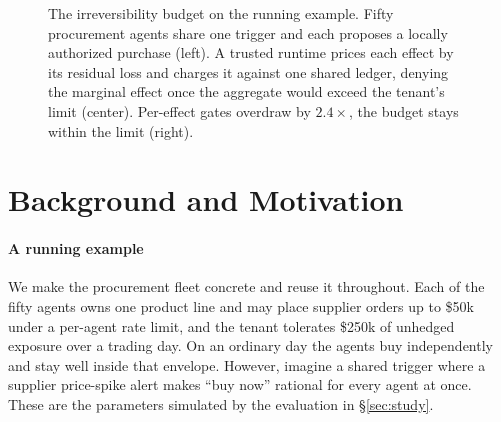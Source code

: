 \documentclass[sigconf]{acmart}
\begin{document}
\begin{figure}[t]
{{%
}}
\caption{The irreversibility budget on the running example. Fifty procurement agents share one trigger and each proposes a locally authorized purchase (left). A trusted runtime prices each effect by its residual loss and charges it against one shared ledger, denying the marginal effect once the aggregate would exceed the tenant's limit (center). Per-effect gates overdraw by $2.4\times$, the budget stays within the limit (right).}
\label{fig:hero}
\end{figure}

\section{Background and Motivation}
\label{sec:background}
\paragraph{A running example} We make the procurement fleet concrete and reuse it throughout. Each of the fifty agents owns one product line and may place supplier orders up to \$50k under a per-agent rate limit, and the tenant tolerates \$250k of unhedged exposure over a trading day. On an ordinary day the agents buy independently and stay well inside that envelope. However, imagine a shared trigger where a supplier price-spike alert makes ``buy now'' rational for every agent at once. These are the parameters simulated by the evaluation in \S\ref{sec:study}.
\end{document}
